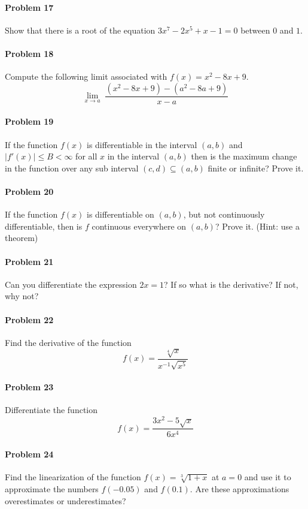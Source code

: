 \documentclass[a4paper, 11pt]{article}
\begin{document}
\paragraph{Problem 17}
Show that there is a root of the equation $3x^7 - 2x^5 + x -1 = 0$ between $0$ and $1$.


\paragraph{Problem 18}
Compute the following limit associated with $f(x) = x^2 - 8x + 9$.
\[
	\lim_{x\rightarrow a} \; \frac{(x^2-8x+9)-(a^2-8a+9)}{x-a}
\]


\paragraph{Problem 19}
If the function $f(x)$ is differentiable in the interval $(a,b)$ and $|f'(x)| \leq B < \infty$ for all $x$ in the interval $(a,b)$ then is the maximum change in the function over any sub interval $(c,d) \subseteq (a,b)$ finite or infinite? Prove it.

\paragraph{Problem 20}
If the function $f(x)$ is differentiable on $(a,b)$, but not continuously differentiable, then is $f$ continuous everywhere on $(a,b)$? Prove it. (Hint: use a theorem)

\paragraph{Problem 21}
Can you differentiate the expression $2x = 1$? If so what is the derivative?  If not, why not?

\paragraph{Problem 22} Find the derivative of the function
\[
	f(x) = \frac{\sqrt[4]{x}}{x^{-1} \sqrt{x^5}}
\]


\paragraph{Problem 23} Differentiate the function
\[
	f(x) = \frac{3x^2 - 5\sqrt{x} }{ 6x^4 }
\]


\paragraph{Problem 24}
Find the linearization of the function $f(x) = \sqrt[3]{1+x}$ at $a=0$ and use it to approximate the numbers $f(-0.05)$ and $f(0.1)$.
Are these approximations overestimates or underestimates?
\end{document}
